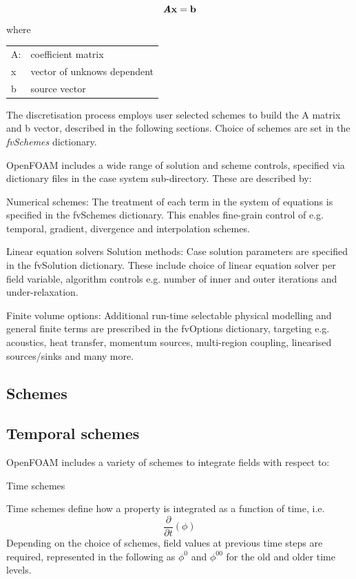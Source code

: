 \documentclass{article}
\begin{document}
\begin{equation}
\textit{\textbf{A}}\textbf{x} = \textbf{b}
\end{equation}
where
\begin{table}[hbp!]
\begin{tabular}{l l}
	A: &   coefficient matrix\\
	x & vector of unknows dependent\\
	b & source vector
\end{tabular}
\end{table}

The discretisation process employs user selected schemes to build the A matrix and b vector, described in the following sections. Choice of schemes are set in the \textit{fvSchemes} dictionary.

OpenFOAM includes a wide range of solution and scheme controls, specified via dictionary files in the case system sub-directory. These are described by:

Numerical schemes: The treatment of each term in the system of equations is specified in the fvSchemes dictionary. This enables fine-grain control of e.g. temporal, gradient, divergence and interpolation schemes.

Linear equation solvers Solution methods: Case solution parameters are specified in the fvSolution dictionary. These include choice of linear equation solver per field variable, algorithm controls e.g. number of inner and outer iterations and under-relaxation.

Finite volume options: Additional run-time selectable physical modelling and general finite terms are prescribed in the fvOptions dictionary, targeting e.g. acoustics, heat transfer, momentum sources, multi-region coupling, linearised sources/sinks and many more.

\subsection{Schemes}

\subsection{Temporal schemes}

OpenFOAM includes a variety of schemes to integrate fields with respect to:

Time schemes

Time schemes define how a property is integrated as a function of time, i.e.
\begin{equation}
\frac{\partial}{\partial t}(\phi)
\end{equation}
Depending on the choice of schemes, field values at previous time steps are required, represented in the following as $\phi^0$ and $\phi^{00}$ for the old and older time levels. 
\end{document}
